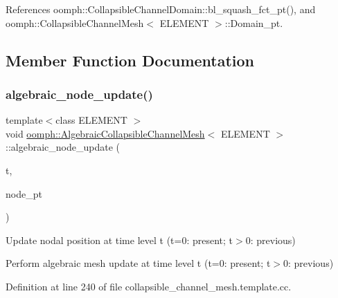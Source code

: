 References oomph\+::\+Collapsible\+Channel\+Domain\+::bl\+\_\+squash\+\_\+fct\+\_\+pt(), and oomph\+::\+Collapsible\+Channel\+Mesh$<$ E\+L\+E\+M\+E\+N\+T $>$\+::\+Domain\+\_\+pt.



\subsection{Member Function Documentation}
\mbox{\label{classoomph_1_1AlgebraicCollapsibleChannelMesh_ae1ea6d9baa12e2ca87d21d4370f41870}} 
\subsubsection{\texorpdfstring{algebraic\+\_\+node\+\_\+update()}{algebraic\_node\_update()}}
{\footnotesize\ttfamily template$<$class E\+L\+E\+M\+E\+NT $>$ \\
void \hyperlink{classoomph_1_1AlgebraicCollapsibleChannelMesh}{oomph\+::\+Algebraic\+Collapsible\+Channel\+Mesh}$<$ E\+L\+E\+M\+E\+NT $>$\+::algebraic\+\_\+node\+\_\+update (\begin{DoxyParamCaption}\item[{const unsigned \&}]{t,  }\item[{Algebraic\+Node $\ast$\&}]{node\+\_\+pt }\end{DoxyParamCaption})}



Update nodal position at time level t (t=0\+: present; t$>$0\+: previous) 

Perform algebraic mesh update at time level t (t=0\+: present; t$>$0\+: previous) 

Definition at line 240 of file collapsible\+\_\+channel\+\_\+mesh.\+template.\+cc.

\mbox{\label{classoomph_1_1AlgebraicCollapsibleChannelMesh_afa53bd526ff0903526afbdf5e6f4f532}} 
